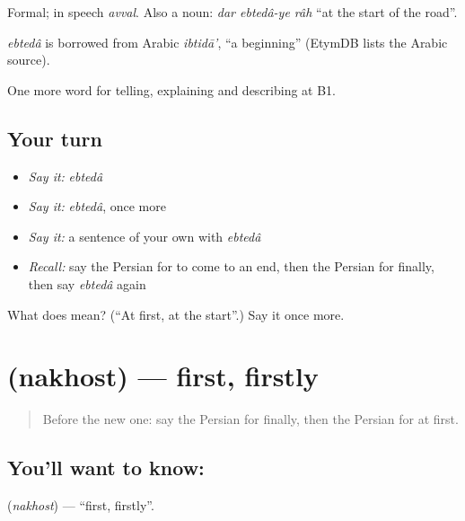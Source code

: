 Formal; in speech \emph{avval}. Also a noun: \emph{dar ebtedâ-ye râh} \textquotedblleft{}at the start of the road\textquotedblright{}.

\begin{cousinweb}
\emph{ebtedâ} is borrowed from Arabic \emph{ibtidā'}, \textquotedblleft{}a beginning\textquotedblright{} (EtymDB lists the Arabic source).
\end{cousinweb}

\begin{grammarlens}[title={What you've built}]
One more word for telling, explaining and describing at B1.
\end{grammarlens}

\subsection*{Your turn}
\begin{itemize}
\raggedright
  \item \emph{Say it:} \emph{ebtedâ}
  \item \emph{Say it:} \emph{ebtedâ}, once more
  \item \emph{Say it:} a sentence of your own with \emph{ebtedâ}
  \item \emph{Recall:} say the Persian for to come to an end, then the Persian for finally, then say \emph{ebtedâ} again
\end{itemize}

\begin{tcolorbox}[breakable,colback=teal!4,colframe=teal!35!black,title={Before you move on}]
What does  mean? (\textquotedblleft{}At first, at the start\textquotedblright{}.) Say it once more.
\end{tcolorbox}
\section[\texorpdfstring{\fa{نخست} (nakhost)}{نخست (nakhost)}]{ (nakhost) — first, firstly}

\label{lesson:FA-C303-nakhost}



\begin{quote}
Before the new one: say the Persian for finally, then the Persian for at first.
\end{quote}

\subsection*{You'll want to know: }
\textbf{} (\emph{nakhost}) — \textquotedblleft{}first, firstly\textquotedblright{}.

